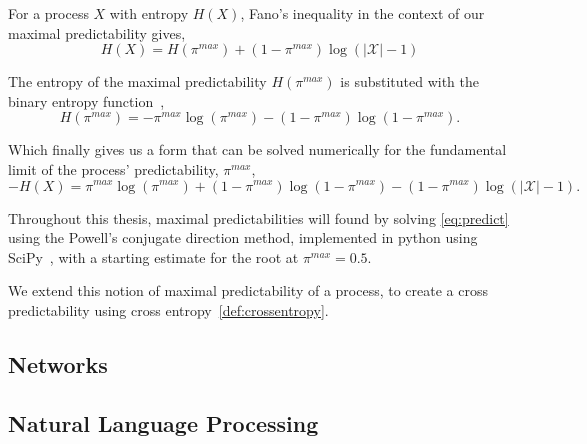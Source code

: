 \begin{definition}
For a process $X$ with entropy $H(X)$, Fano's inequality in the context of our maximal predictability gives,
\begin{equation}
H(X) = H(\pi^{max}) + (1 - \pi^{max}) \log (|\mathcal{X}| - 1)
\end{equation}
\end{definition}

The entropy of the maximal predictability $H(\pi^{max})$ is substituted with the binary entropy function~\cite{song_limits_2010},   
\begin{equation}
H(\pi^{max}) = -\pi^{max} \log(\pi^{max}) - (1 -  \pi^{max}) \log(1 - \pi^{max}).
\end{equation}

Which finally gives us a form that can be solved numerically for the fundamental limit of the process' predictability, $\pi^{max}$,
\begin{equation}\label{eq:predict}
-H(X)  = \pi^{max} \log(\pi^{max}) + (1 -  \pi^{max}) \log(1 - \pi^{max}) - (1 - \pi^{max}) \log (|\mathcal{X}| - 1).
\end{equation}


Throughout this thesis, maximal predictabilities will found by solving \autoref{eq:predict} using the Powell's conjugate direction method, implemented in python using SciPy~\cite{virtanen_scipy_2019}, with a starting estimate for the root at $\pi^{max}=0.5$.



We extend this notion of maximal predictability of a process, to create a cross predictability using cross entropy~\autoref{def:crossentropy}.



\subsection{Networks}








\subsection{Natural Language Processing}


